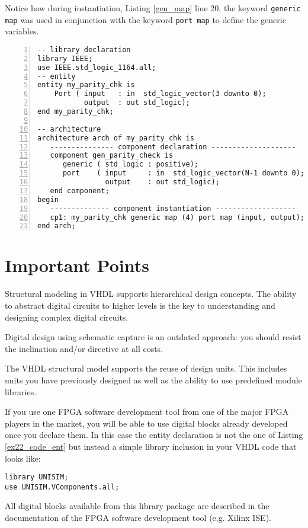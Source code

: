 Notice how during instantiation, Listing \ref{gen_map} line 20, the keyword \texttt{generic map} was used in conjunction with the keyword \texttt{port map} to define the generic variables.

\noindent
\begin{minipage}{0.99\linewidth}
\begin{lstlisting}[numbers=left, label=gen_map, caption=Use of \texttt{generic} for the construct of a generic parity check code.]
-- library declaration
library IEEE;
use IEEE.std_logic_1164.all;
-- entity
entity my_parity_chk is
    Port ( input   : in  std_logic_vector(3 downto 0);
           output  : out std_logic);
end my_parity_chk;

-- architecture
architecture arch of my_parity_chk is 
   --------------- component declaration --------------------
   component gen_parity_check is
      generic ( std_logic : positive);
      port    ( input     : in  std_logic_vector(N-1 downto 0);
                output    : out std_logic);
   end component;
begin
   -------------- component instantiation -------------------
   cp1: my_parity_chk generic map (4) port map (input, output);
end arch;

\end{lstlisting}
\end{minipage}

\section{Important Points}
\begin{my_list}
\item Structural modeling in VHDL supports hierarchical design concepts. The ability to abstract digital circuits to higher levels is the key to understanding and designing complex digital circuits.

\item Digital design using schematic capture is an outdated approach: you should resist the inclination and/or directive at all costs.

\item The VHDL structural model supports the reuse of design units. This includes units you have previously designed as well as the ability to use predefined module libraries.

\item If you use one FPGA software development tool from one of the major FPGA players in the market, you will be able to use digital blocks already developed once you declare them. In this case the entity declaration is not the one of Listing \ref{ex22_code_ent} but instead a simple library inclusion in your VHDL code that looks like:

\vspace*{5pt}
\noindent
\begin{minipage}{0.99\textwidth}
\texttt{library UNISIM;}\\
\texttt{use UNISIM.VComponents.all;}\\
\end{minipage}
All digital blocks available from this library package are described in the documentation of the FPGA software development tool (e.g. Xilinx ISE).
\end{my_list}


